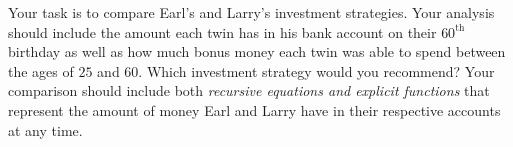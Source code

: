 \documentclass[10pt,]{book}
\theoremstyle{plain}
\theoremstyle{definition}
\theoremstyle{definition}
\theoremstyle{definition}
\numberwithin{equation}{section}
\begin{document}
\begin{exerciselist}
\par
%
\par
Your task is to compare Earl's and Larry's investment strategies.  Your analysis should include the amount each twin has in his bank account on their \(60^{\text{th}}\) birthday as well as how much bonus money each twin was able to spend between the ages of \(25\) and \(60\).  Which investment strategy would you recommend?  Your comparison should include both \emph{recursive equations and explicit functions} that represent the amount of money Earl and Larry have in their respective accounts at any time.%
\par\smallskip
\end{exerciselist}
\typeout{************************************************}
\typeout{************************************************}
\end{document}
